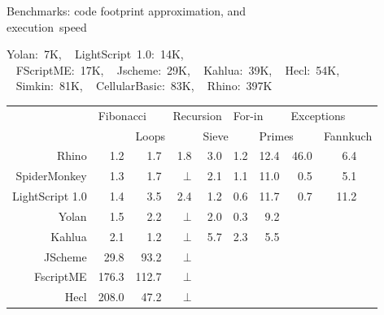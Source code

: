 \documentclass[a4paper,landscape]{slides}
\begin{document}
\begin{slide}
	{\large 
            Benchmarks: code footprint approximation, and\\ 
            \mbox{} \hspace{5em} execution~speed
            }

Yolan:~7K,
~        LightScript~1.0:~14K,\\ 
~        FScriptME:~17K,
~        Jscheme:~29K,
~        Kahlua:~39K,
~        Hecl:~54K, \\
~        Simkin:~81K,
~        CellularBasic:~83K,
~        Rhino:~397K
        \begin{center} \begin{tabular}{|r|r|r|r|r|r|r|r|rr|} \hline
        & \multicolumn{2}{|l|}{Fibonacci} & \multicolumn{2}{|l|}{Recursion} & \multicolumn{2}{|l|}{For-in} & \multicolumn{2}{|l}{Exceptions} & \\
        & & \multicolumn{2}{|l|}{Loops} & \multicolumn{2}{|l|}{Sieve} & \multicolumn{2}{|l|}{Primes} & \multicolumn{2}{|l|}{Fannkuch} \\
        \hline Rhino       & 1.2 & 1.7 & 1.8   & 3.0 & 1.2 & 12.4 & 46.0 & 6.4 & \\
        \hline SpiderMonkey& 1.3 & 1.7 & $\bot$ & 2.1 & 1.1 & 11.0 & 0.5  & 5.1 & \\
        \hline LightScript 1.0 & 1.4 & 3.5 & 2.4   & 1.2 & 0.6 & 11.7 & 0.7  & 11.2 & \\
        \hline Yolan       & 1.5 & 2.2 & $\bot$ & 2.0 & 0.3 &  9.2 &  &  & \\
        \hline Kahlua      & 2.1 & 1.2 & $\bot$ &  5.7 & 2.3 & 5.5 &  &  & \\
        \hline JScheme    & 29.8 & 93.2 & $\bot$ & & & & & & \\
        \hline FscriptME & 176.3 & 112.7& $\bot$ & & & & & & \\
        \hline Hecl      & 208.0 & 47.2 & $\bot$ & & & & & & \\
        \hline \end{tabular}
        \end{center}

\end{slide}
\end{document}
